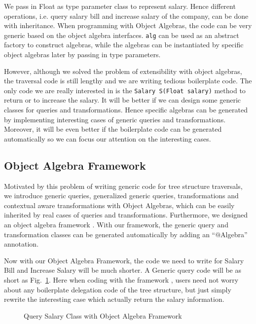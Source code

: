   
We pass in Float as type parameter class to represent salary. Hence different operations, i.e. query salary bill and increase salary of the company, can be done with inheritance. When programming with Object Algebras, the code can be very generic based on the object algebra interfaces. \lstinline{alg} can be used as an abstract factory to construct algebras, while the algebras can be instantiated by specific object algebras later by passing in type parameters. 

However, although we solved the problem of extensibility with object algebras, the traversal code is still lengthy and we are writing tedious boilerplate code. The only code we are really interested in is the \lstinline{Salary S(Float salary)} method to return or to increase the salary. It will be better if we can design some generic classes for queries and transformations. Hence specific algebras can be generated by
implementing interesting cases of generic queries and
transformations. Moreover, it will be even better if the boilerplate code can be generated automatically so we can focus our attention on the interesting cases.

\subsection{Object Algebra Framework}
Motivated by this problem of writing generic code for tree structure
traversals, we introduce generic queries, generalized generic queries, transformations and contextual aware transformations with Object Algebras, which can be easily inherited by real cases of queries and transformations. Furthermore, we designed an object algebra framework \name. With our framework, the generic query and transformation classes can be generated automatically by adding an ``$@$Algebra'' annotation.

Now with our Object Algebra Framework, the code we need to write for Salary Bill and Increase Salary will be much shorter. A Generic query code will be as short as Fig.~\ref{query_with_oaframework}. Here when coding with the framework \name, users need not worry about any boilerplate delegation code of the tree structure, but just simply rewrite the interesting case which actually return the salary information.
\begin{figure}[tb]
\vspace{-.1in}
\caption{Query Salary Class with Object Algebra Framework}
\label{query_with_oaframework}
\end{figure}


